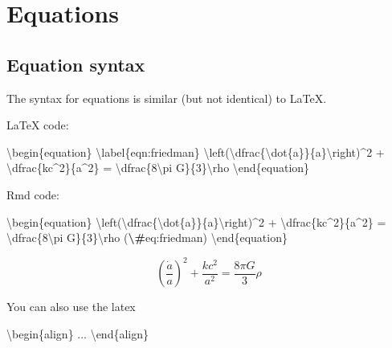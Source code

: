 \documentclass[
]{book}
\newenvironment{Shaded}{\begin{snugshade}}{\end{snugshade}}
\newcommand{\NormalTok}[1]{#1}
\newcommand{\SpecialCharTok}[1]{\textcolor[rgb]{0.81,0.36,0.00}{\textbf{#1}}}
\begin{document}
\chapter{Equations}\label{sec:equations}

\section{Equation syntax}\label{sec:add-eqs}

The syntax for equations is similar (but not identical) to LaTeX.

LaTeX code:

\begin{Shaded}
\begin{Highlighting}[]
\NormalTok{\textbackslash{}begin\{equation\}}
\NormalTok{\textbackslash{}label\{eqn:friedman\}}
\NormalTok{    \textbackslash{}left(\textbackslash{}dfrac\{\textbackslash{}dot\{a\}\}\{a\}\textbackslash{}right)\^{}2 + \textbackslash{}dfrac\{kc\^{}2\}\{a\^{}2\} = \textbackslash{}dfrac\{8\textbackslash{}pi G\}\{3\}\textbackslash{}rho }
\NormalTok{\textbackslash{}end\{equation\}}
\end{Highlighting}
\end{Shaded}

Rmd code:

\begin{Shaded}
\begin{Highlighting}[]
\NormalTok{\textbackslash{}begin\{equation\}}
\NormalTok{    \textbackslash{}left(\textbackslash{}dfrac\{\textbackslash{}dot\{a\}\}\{a\}\textbackslash{}right)\^{}2 + \textbackslash{}dfrac\{kc\^{}2\}\{a\^{}2\} = \textbackslash{}dfrac\{8\textbackslash{}pi G\}\{3\}\textbackslash{}rho}
\NormalTok{(}\SpecialCharTok{\textbackslash{}\#}\NormalTok{eq:friedman)}
\NormalTok{\textbackslash{}end\{equation\}}
\end{Highlighting}
\end{Shaded}

\begin{equation}
    \left(\dfrac{\dot{a}}{a}\right)^2 + \dfrac{kc^2}{a^2} = \dfrac{8\pi G}{3}\rho
\label{eq:friedman}
\end{equation}

You can also use the latex

\begin{Shaded}
\begin{Highlighting}[]
\NormalTok{\textbackslash{}begin\{align\}}
\NormalTok{...}
\NormalTok{\textbackslash{}end\{align\}}
\end{Highlighting}
\end{Shaded}
\end{document}
